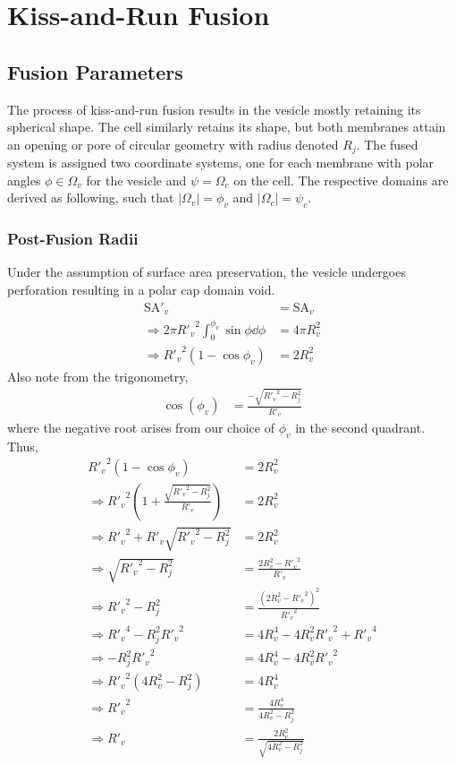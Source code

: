 \documentclass{report}
\newcommand\Par[1]{{ \left({#1}\right) }}
\newcommand\Abs[1]{{ \left\lvert{#1}\right\rvert }}
\newcommand\Rv{{ R'_v }}
\newcommand\SA{{ \text{SA} }}
\begin{document}
\chapter{Kiss-and-Run Fusion}
\section{Fusion Parameters}
The process of kiss-and-run fusion results in the vesicle mostly retaining its spherical shape. The cell similarly retains its shape, but both membranes attain an opening or pore of circular geometry with radius denoted $R_j$. The fused system is assigned two coordinate systems, one for each membrane with polar angles $\phi \in \Omega_v$ for the vesicle and $\psi = \Omega_c$ on the cell. The respective domains are derived as following, such that $\Abs{\Omega_v} = \phi_v$ and $\Abs{\Omega_c} = \psi_c$.

\subsection{Post-Fusion Radii}
Under the assumption of surface area preservation, the vesicle undergoes perforation resulting in a polar cap domain void.
\begin{align*}
	\SA'_v &= \SA_v \\
	\Rightarrow 2\pi \Rv^2 \int_0^{\phi_v} \sin\phi \dd{\phi} &= 4\pi R_v^2 \\
	\Rightarrow \Rv^2 \Par{1 - \cos\phi_v} &= 2 R_v^2
\end{align*}
Also note from the trigonometry,
\begin{align*}
	\cos(\phi_v) &= \frac{-\sqrt{\Rv^2 - R_j^2}}{\Rv}
\end{align*}
where the negative root arises from our choice of $\phi_v$ in the second quadrant. Thus,
\begin{align*}
	\Rv^2 \Par{1 - \cos\phi_v} &= 2 R_v^2 \\
	\Rightarrow \Rv^2 \Par{1 + \frac{\sqrt{\Rv^2 - R_j^2}}{\Rv}} &= 2 R_v^2 \\
	\Rightarrow \Rv^2 + \Rv\sqrt{\Rv^2 - R_j^2} &= 2 R_v^2 \\
	\Rightarrow \sqrt{\Rv^2 - R_j^2} &= \frac{2 R_v^2 - \Rv^2}{\Rv} \\
	\Rightarrow \Rv^2 - R_j^2 &= \frac{\Par{2 R_v^2 - \Rv^2}^2}{\Rv^2} \\
	\Rightarrow \Rv^4 - R_j^2 \Rv^2 &= 4R_v^4 - 4R_v^2\Rv^2 + \Rv^4 \\
	\Rightarrow -R_j^2 \Rv^2 &= 4R_v^4 - 4R_v^2\Rv^2 \\
	\Rightarrow \Rv^2\Par{4R_v^2 - R_j^2} &= 4R_v^4 \\
	\Rightarrow \Rv^2 &= \frac{4R_v^4}{4R_v^2 - R_j^2} \\
	\Rightarrow \Rv &= \frac{2R_v^2}{\sqrt{4R_v^2 - R_j^2}}
\end{align*}
\end{document}
